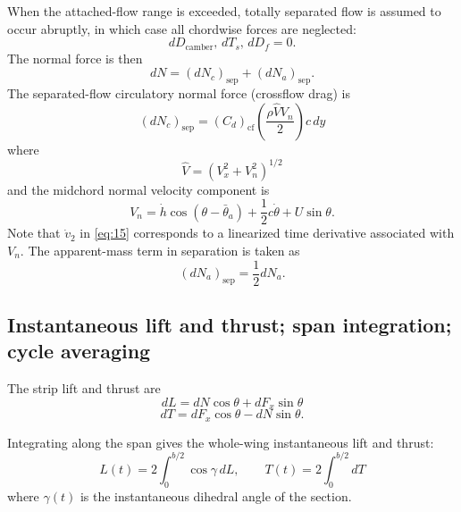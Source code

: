 \documentclass[11pt,a4paper]{article}
\begin{document}
When the attached-flow range is exceeded, totally separated flow is assumed to occur abruptly,
in which case all chordwise forces are neglected:
\begin{equation}
dD_{\text{camber}},\,dT_s,\,dD_f=0.
\tag{24}\label{eq:24}
\end{equation}
The normal force is then
\begin{equation}
dN=\left(dN_c\right)_{\text{sep}}+\left(dN_a\right)_{\text{sep}}.
\tag{25}\label{eq:25}
\end{equation}
The separated-flow circulatory normal force (crossflow drag) is
\begin{equation}
\left(dN_c\right)_{\text{sep}}=\left(C_d\right)_{\text{cf}}\left(\frac{\rho\hat{V}V_n}{2}\right)c\,dy
\tag{26}\label{eq:26}
\end{equation}
where
\begin{equation}
\hat{V}=\left(V_x^2+V_n^2\right)^{1/2}
\tag{27}\label{eq:27}
\end{equation}
and the midchord normal velocity component is
\begin{equation}
V_n=\dot{h}\cos(\theta-\bar{\theta}_a)+\frac{1}{2}c\dot{\theta}+U\sin\theta.
\tag{28}\label{eq:28}
\end{equation}
Note that $\dot{v}_2$ in \eqref{eq:15} corresponds to a linearized time derivative associated with $V_n$.
The apparent-mass term in separation is taken as
\begin{equation}
\left(dN_a\right)_{\text{sep}}=\frac{1}{2}dN_a.
\tag{29}\label{eq:29}
\end{equation}

\subsection{Instantaneous lift and thrust; span integration; cycle averaging}
The strip lift and thrust are
\begin{equation}
dL=dN\cos\theta+dF_x\sin\theta
\tag{30}\label{eq:30}
\end{equation}
\begin{equation}
dT=dF_x\cos\theta-dN\sin\theta.
\tag{31}\label{eq:31}
\end{equation}

Integrating along the span gives the whole-wing instantaneous lift and thrust:
\begin{equation}
L(t)=2\int_{0}^{b/2}\cos\gamma\,dL,\qquad
T(t)=2\int_{0}^{b/2}dT
\tag{32}\label{eq:32}
\end{equation}
where $\gamma(t)$ is the instantaneous dihedral angle of the section.
\end{document}
